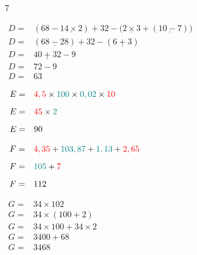 \documentclass[a4paper]{book}
\begin{document}
{\begin{exerciceNote}{7}
\begin{minipage}{0.35\linewidth}
            \bigskip

            $\begin{array}{ll}
                D = & (68-\underline{14\times2})+32-\big(\underline{2\times3}+(\underline{10-7})\big) \\[2ex]
                D = & (\underline{68-28})+32-(\underline{6+3})\\[2ex]
                D = & \underline{40+32}-9\\[2ex]
                D = & 72-9\\[2ex]
                D = & 63
            \end{array}$
        \end{minipage}
        \vline
        \begin{minipage}{0.3\linewidth}
            $\begin{array}{ll}
                E = & \textcolor{red}{4,5}\times \textcolor{teal}{100} \times \textcolor{teal}{0,02} \times \textcolor{red}{10} \\[2ex]
                E = & \textcolor{red}{45}\times\textcolor{teal}{2}\\[2ex]
                E = & 90
            \end{array}$

            \bigskip

            $\begin{array}{ll}
                F = & \textcolor{red}{4,35} + \textcolor{teal}{103,87}+\textcolor{teal}{1,13}+\textcolor{red}{2,65} \\[2ex]
                F = & \textcolor{teal}{105}+\textcolor{red}{7}\\[2ex]
                F = & 112
            \end{array}$

            \bigskip

            $\begin{array}{ll}
                G = & 34\times102 \\[2ex]
                G = & 34\times (100+2)\\[2ex]
                G = & 34\times100 + 34\times2 \\[2ex]
                G = & 3400 + 68\\[2ex]
                G = & 3468
            \end{array}$
        \end{minipage}
    \end{exerciceNote}



}
\end{document}
